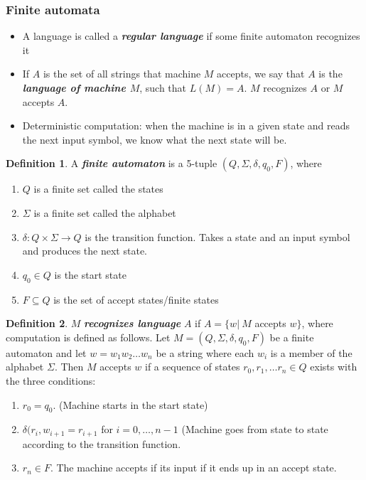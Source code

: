 \documentclass[11pt]{article}
\theoremstyle{definition}
\newtheorem{defn}{Definition}[section]
\begin{document}
\subsubsection{Finite automata}
\begin{itemize}[leftmargin=*]
    \item A language is called a \textbf{\textit{regular language}} if some finite automaton recognizes it
    \item If $A$ is the set of all strings that machine $M$ accepts, we say that $A$ is the \textbf{\textit{language of machine $M$}}, such that $L(M)=A$. $M$ recognizes $A$ or $M$ accepts $A$.
    \item Deterministic computation: when the machine is in a given state and reads the next input symbol, we know what the next state will be.
\end{itemize}
\begin{defn}
A \textbf{\textit{finite automaton}} is a 5-tuple $(Q,\Sigma, \delta, q_0, F)$, where
\begin{enumerate}
    \item $Q$ is a finite set called the states 
    \item $\Sigma$ is a finite set called the alphabet
    \item $\delta: Q\times\Sigma \longrightarrow Q$ is the transition function. Takes a state and an input symbol and produces the next state.
    \item $q_0 \in Q$ is the start state
    \item $F\subseteq Q$ is the set of accept states/finite states
\end{enumerate}
\end{defn}
\begin{defn}
$M$ \textbf{\textit{recognizes language}} $A$ if $A=\{w |\ M$ accepts $w\}$, where computation is defined as follows. Let $M = (Q,\Sigma, \delta, q_0,F)$ be a finite automaton and let $w=w_1w_2\ldots w_n$ be a string where each $w_i$ is a member of the alphabet $\Sigma$. Then $M$ accepts $w$ if a sequence of states $r_0,r_1,\ldots r_n \in Q$ exists with the three conditions:
\begin{enumerate}
    \item $r_0 = q_0$. (Machine starts in the start state) 
    \item $\delta(r_i, w_{i+1} = r_{i+1}$ for $i = 0, \ldots, n-1$ (Machine goes from state to state according to the transition function.
    \item $r_n \in F$. The machine accepts if its input if it ends up in an accept state.
\end{enumerate}
\end{defn}
\end{document}
